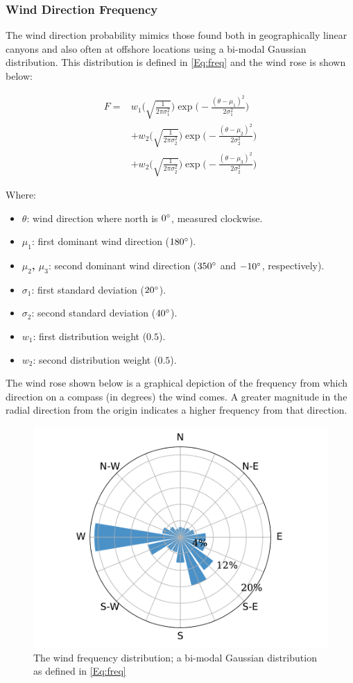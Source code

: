 \documentclass[]{aiaa-tc}
\begin{document}
\subsubsection{Wind Direction Frequency}

The wind direction probability mimics those found both in geographically linear canyons and also often at offshore locations using a bi-modal Gaussian distribution. This distribution is defined in  \cref{Eq:freq} and the wind rose is shown below: %

\begin{align}
	F = & w_1\Bigg(\sqrt{\frac{1}{2 \pi \sigma_1^2}}\Bigg)\exp\Bigg(-\frac{(\theta-\mu_1)^2}{2 \sigma_1^2}\Bigg) \nonumber   \\
	    & + w_2\Bigg(\sqrt{\frac{1}{2 \pi \sigma_2^2}}\Bigg)\exp\Bigg(-\frac{(\theta-\mu_2)^2}{2 \sigma_2^2}\Bigg) \nonumber \\
	    & + w_2\Bigg(\sqrt{\frac{1}{2 \pi \sigma_2^2}}\Bigg)\exp\Bigg(-\frac{(\theta-\mu_3)^2}{2 \sigma_2^2}\Bigg)
	\label{Eq:freq}
\end{align}

Where:
\begin{itemize}
	\item \textbf{$\theta$}: wind direction where north is $0 \degree$, measured clockwise.
	\item \textbf{$\mu_1$}: first dominant wind direction ($180\degree$).
	\item \textbf{$\mu_2$, $\mu_3$}: second dominant wind direction ($350\degree$ and $-10\degree$, respectively).
	\item \textbf{$\sigma_1$}: first standard deviation ($20 \degree$).
	\item \textbf{$\sigma_2$}: second standard deviation ($40 \degree$).
	\item \textbf{$w_1$}: first distribution weight ($0.5$).
	\item \textbf{$w_2$}: second distribution weight ($0.5$).
\end{itemize}

The wind rose shown below is a graphical depiction of the frequency from which direction on a compass (in degrees) the wind comes. A greater magnitude in the radial direction from the origin indicates a higher frequency from that direction.
\begin{figure}[H]
    \centering \includegraphics[width=.5\textwidth]{windrose.pdf}
	\caption{The wind frequency distribution; a bi-modal Gaussian distribution as defined in \cref{Eq:freq}}
	\label{Fig:freq}
\end{figure}
\end{document}
